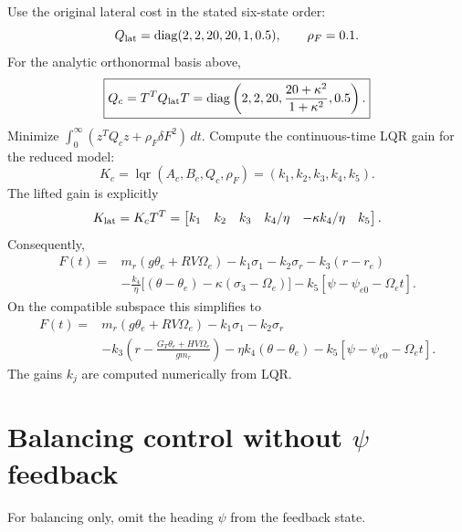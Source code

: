 Use the original lateral cost in the stated six-state order:
\begin{equation}
Q_{\rm lat}=\operatorname{diag}(2,2,20,20,1,0.5),\qquad \rho_F=0.1.
\end{equation}
For the analytic orthonormal basis above,
\begin{equation}
\boxed{Q_c=T^TQ_{\rm lat}T
=\operatorname{diag}\left(2,2,20,
\frac{20+\kappa^2}{1+\kappa^2},0.5\right).}
\end{equation}
Minimize $\int_0^\infty(z^TQ_cz+\rho_F\delta F^2)\,dt$.
Compute the continuous-time LQR gain for the reduced model:
\begin{equation}
K_c=\operatorname{lqr}(A_c,B_c,Q_c,\rho_F)
=(k_1,k_2,k_3,k_4,k_5).
\end{equation}
The lifted gain is explicitly
\begin{equation}
K_{\rm lat}=K_cT^T
=\begin{bmatrix}k_1&k_2&k_3&k_4/\eta&-\kappa k_4/\eta&k_5\end{bmatrix}.
\end{equation}
Consequently,
\begin{equation}
\boxed{\begin{aligned}
F(t)={}&m_r(g\theta_e+RV\Omega_e)
-k_1\sigma_1-k_2\sigma_r-k_3(r-r_e)\\
&-\frac{k_4}{\eta}
\bigl[(\theta-\theta_e)-\kappa(\sigma_3-\Omega_e)\bigr]
-k_5[\psi-\psi_{e0}-\Omega_e t].
\end{aligned}}
\end{equation}
On the compatible subspace this simplifies to
\begin{equation}
\boxed{\begin{aligned}
F(t)={}&m_r(g\theta_e+RV\Omega_e)
-k_1\sigma_1-k_2\sigma_r\\
&-k_3\left(r-\frac{G_T\theta_e+HV\Omega_e}{gm_r}\right)
-\eta k_4(\theta-\theta_e)
-k_5[\psi-\psi_{e0}-\Omega_e t].
\end{aligned}}
\end{equation}
The gains $k_j$ are computed numerically from LQR.


\section{Balancing control without $\psi$ feedback}
\label{sec:balance-no-heading}

For balancing only, omit the heading $\psi$ from the feedback state.

